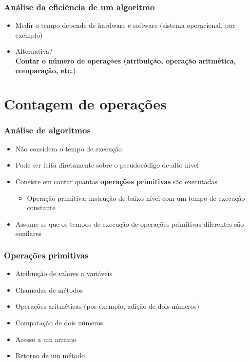 \documentclass[aspectratio=169]{beamer}
\begin{document}
\begin{frame}\frametitle{Análise da eficiência de um algoritmo}
\begin{itemize}
	\item Medir o tempo depende de hardware e software (sistema operacional, por exemplo)
	\item Alternativa?\\
	\pause
	\textbf{Contar o número de operações (atribuição, operação aritmética, comparação, etc.)}
\end{itemize}
\end{frame}

\section{Contagem de operações}

\begin{frame}\frametitle{Análise de algoritmos}
\begin{itemize}
	\item Não considera o tempo de execução
	\item Pode ser feita diretamente sobre o pseudocódigo de alto nível
	\item Consiste em contar quantas \textbf{operações primitivas} são executadas
	\begin{itemize}
		\item Operação primitiva: instrução de baixo nível com um tempo de execução constante
	\end{itemize}
	\item Assume-se que os tempos de execução de operações primitivas diferentes são similares
\end{itemize}
\end{frame}

\begin{frame}\frametitle{Operações primitivas}
\begin{itemize}
	\item Atribuição de valores a variáveis
	\item Chamadas de métodos
	\item Operações aritméticas (por exemplo, adição de dois números)
	\item Comparação de dois números
	\item Acesso a um arranjo
	\item Retorno de um método
\end{itemize}
\end{frame}
\end{document}
